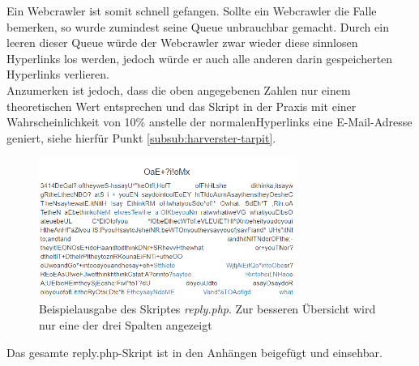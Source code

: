 Ein Webcrawler ist somit schnell gefangen. Sollte ein Webcrawler die Falle bemerken, so wurde zumindest seine Queue unbrauchbar gemacht. Durch ein leeren dieser Queue würde der Webcrawler zwar wieder diese sinnlosen Hyperlinks los werden, jedoch würde er auch alle anderen darin gespeicherten Hyperlinks verlieren.\\
Anzumerken ist jedoch, dass die oben angegebenen Zahlen nur einem theoretischen Wert entsprechen und das Skript in der Praxis mit einer Wahrscheinlichkeit von 10\% anstelle der \glqq normalen\grqq\space Hyperlinks eine E-Mail-Adresse geniert, siehe hierfür Punkt \ref{subsub:harverster-tarpit}.\\
\begin{figure}[H]
	\centering
	\includegraphics[width=8.45cm]{img/beispiel-hyperlink1.PNG}
	\caption{Beispielausgabe des Skriptes \emph{reply.php}. Zur besseren Übersicht wird nur eine der drei Spalten angezeigt}
	\label{fig:beispiel-hyperlink}
\end{figure}
Das gesamte reply.php-Skript ist in den Anhängen beigefügt und einsehbar.
\label{subsub:hyperlink-tarpit}

